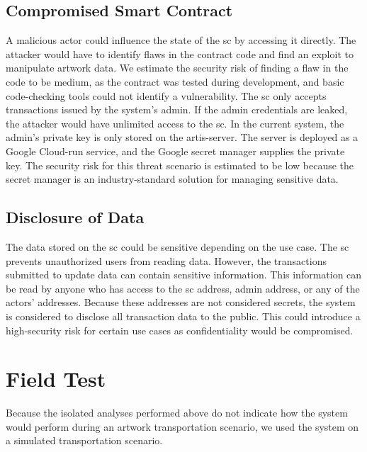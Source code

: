 \subsection{Compromised Smart Contract}
A malicious actor could influence the state of the \gls{sc} by accessing it directly. The attacker would have to identify flaws in the contract code and find an exploit to manipulate artwork data. We estimate the security risk of finding a flaw in the code to be medium, as the contract was tested during development, and basic code-checking tools could not identify a vulnerability. The \gls{sc} only accepts transactions issued by the system's admin. If the admin credentials are leaked, the attacker would have unlimited access to the \gls{sc}. In the current system, the admin's private key is only stored on the artis-server. The server is deployed as a Google Cloud-run service, and the Google secret manager supplies the private key. The security risk for this threat scenario is estimated to be low because the secret manager is an industry-standard solution for managing sensitive data.

\subsection{Disclosure of Data}
The data stored on the \gls{sc} could be sensitive depending on the use case. The \gls{sc} prevents unauthorized users from reading data. However, the transactions submitted to update data can contain sensitive information. This information can be read by anyone who has access to the \gls{sc} address, admin address, or any of the actors' addresses. Because these addresses are not considered secrets, the system is considered to disclose all transaction data to the public. This could introduce a high-security risk for certain use cases as confidentiality would be compromised.

\section{Field Test}
\label{sec:field_test}
Because the isolated analyses performed above do not indicate how the system would perform during an artwork transportation scenario, we used the system on a simulated transportation scenario.

